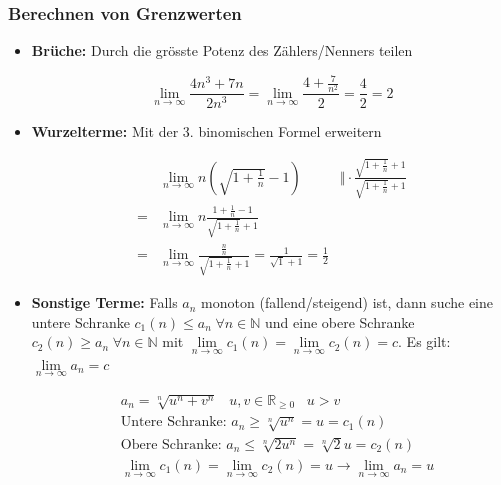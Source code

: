 \documentclass[8pt, a4paper, landscape, fleqn]{scrartcl}
\newenvironment {example}
				{\begin{itshape} \begin{small}}
				{\end{small} \end{itshape}}
\begin{document}
\begin{multicols*}{3}
				\subsubsection{Berechnen von Grenzwerten}
				\label{subsubsection:limitcalc}
					\begin{itemize}
						\item \textbf{Brüche:} Durch die grösste Potenz des Zählers/Nenners teilen
						\begin{example}
							\begin{equation*}
							\lim_{n\rightarrow \infty} \frac{4n^3+7n}{2n^3}=\lim_{n\rightarrow \infty} \frac{4+\frac{7}{n^2}}{2}=\frac{4}{2}=2
							\end{equation*}
						\end{example}						
						\item  \textbf{Wurzelterme:} Mit der 3. binomischen Formel erweitern
						\begin{example}
							\begin{align*}
							&\lim_{n\rightarrow \infty} n \left(\sqrt{1+\frac{1}{n}}-1\right) &\Vert \cdot \frac{\sqrt{1+\frac{1}{n}}+1}{\sqrt{1+\frac{1}{n}}+1}\\
							=&\lim_{n\rightarrow \infty} n\frac{1+\frac{1}{n}-1}{\sqrt{1+\frac{1}{n}}+1}\\
							=&\lim_{n\rightarrow \infty} \frac{\frac{n}{n}}{\sqrt{1+\frac{1}{n}}+1}=\frac{1}{\sqrt{1}+1}=\frac{1}{2}
							\end{align*}
						\end{example}						
						\item \textbf{Sonstige Terme:} Falls $a_n$ monoton (fallend/steigend) ist, dann suche eine untere Schranke $c_1(n) \le a_n \hspace{3pt} \forall n \in \mathbb{N}$ und eine obere Schranke $c_2(n) \ge a_n \hspace{3pt} \forall n \in \mathbb{N}$ mit $\lim\limits_{n \rightarrow \infty} c_1(n)=\lim\limits_{n \rightarrow \infty} c_2(n)=c$. Es gilt:
						$\lim\limits_{n \rightarrow \infty} a_n=c$
						\begin{example}
							\begin{align*}
								&a_n=\sqrt[n]{u^n+v^n} \hspace{10pt} u, v \in \mathbb{R}_{\ge 0} \hspace{10pt} u>v\\
								&\text{Untere Schranke: } a_n \ge \sqrt[n]{u^n}=u=c_1(n)\\
								&\text{Obere Schranke: } a_n \le \sqrt[n]{2u^n}=\sqrt[n]{2}u=c_2(n)\\
								&\lim_{n\rightarrow \infty}c_1(n)=\lim_{n\rightarrow \infty}c_2(n)=u \rightarrow \lim_{n\rightarrow \infty} a_n=u
							\end{align*}
						\end{example}					
					\end{itemize}

\end{multicols*}
\end{document}
